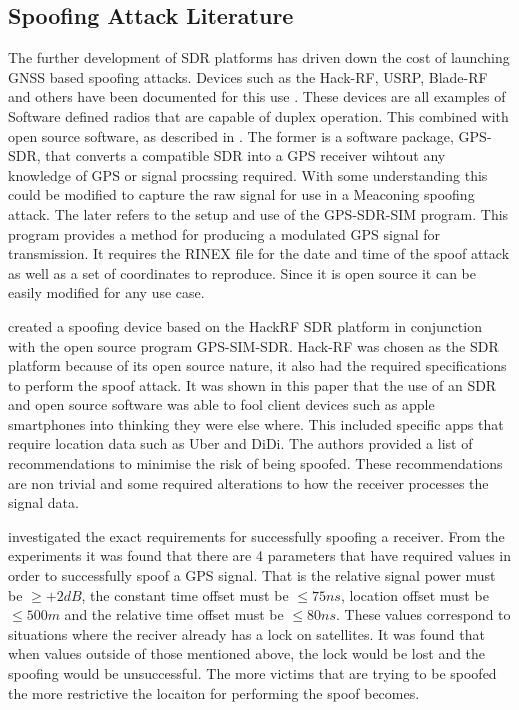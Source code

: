 %
%

\subsection{Spoofing Attack Literature} \label{Subsec:SpoofLit}
The further development of SDR platforms has driven down the cost of launching GNSS based spoofing attacks. Devices such as the Hack-RF, USRP, Blade-RF and others have
been documented for this use \cite{RN4} \cite{RN9}. These devices are all examples of Software defined radios that are capable of duplex operation. This combined with
open source software, as described in \cite{RN16} \cite{RN57} \cite{RN4}. The former is a software package, GPS-SDR, that converts a compatible SDR into a GPS receiver
wihtout any knowledge of GPS or signal procssing required. With some understanding this could be modified to capture the raw signal for use in a Meaconing spoofing
attack. The later refers to the setup and use of the GPS-SDR-SIM program. This program provides a method for producing a modulated GPS signal for transmission. It
requires the RINEX file for the date and time of the spoof attack as well as a set of coordinates to reproduce. Since it is open source it can be easily modified for any
use case. 

\textcite{RN28} created a spoofing device based on the HackRF SDR platform in conjunction with the open source program GPS-SIM-SDR. Hack-RF was chosen as the SDR platform
because of its open source nature, it also had the required specifications to perform the spoof attack. It was shown in this paper that the use of an SDR and open source
software was able to fool client devices such as apple smartphones into thinking they were else where. This included specific apps that require location data such as Uber
and DiDi. The authors provided a list of recommendations to minimise the risk of being spoofed. These recommendations are non trivial and some required alterations to how
the receiver processes the signal data.

\textcite{RN30} investigated the exact requirements for successfully spoofing a receiver. From the experiments it was found that there are 4 parameters that have required
values in order to successfully spoof a GPS signal. That is the relative signal power must be $\geq+2dB$, the constant time offset must be $\leq 75ns$, location offset
must be $\leq 500m$ and the relative time offset must be $\leq 80ns$. These values correspond to situations where the reciver already has a lock on satellites. It was
found that when values outside of those mentioned above, the lock would be lost and the spoofing would be unsuccessful. The more victims that are trying to be spoofed the
more restrictive the locaiton for performing the spoof becomes.

